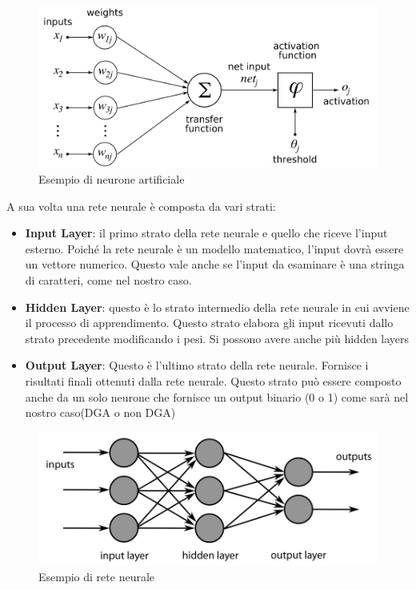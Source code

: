 \documentclass[12pt,a4paper,openright,twoside]{book}
\begin{document}
\begin{figure}
    \centering
    \includegraphics[width=.8\linewidth]{figures/ArtificialNeuronModel.png}
    \caption{Esempio di neurone artificiale \cite{wiki:xxx}}
    \label{fig:AN}
\end{figure}

A sua volta una rete neurale è composta da vari strati:
\begin{itemize}
    \item \textbf{Input Layer}: il primo strato della rete neurale
    e quello che riceve l'input esterno. Poiché la rete neurale
    è un modello matematico, l'input dovrà essere
    un vettore numerico. Questo vale anche se l'input da esaminare
    è una stringa di caratteri, come nel nostro caso.
    \item \textbf{Hidden Layer}: questo è lo strato intermedio della rete neurale in cui avviene
    il processo di apprendimento.
    Questo strato elabora gli input ricevuti dallo strato precedente
    modificando i pesi. Si possono avere anche più hidden layers
    \item \textbf{Output Layer}: Questo è l'ultimo strato della rete neurale.
    Fornisce i risultati finali ottenuti dalla rete neurale. Questo strato
    può essere composto anche da un solo neurone che fornisce
    un output binario (0 o 1) come sarà nel nostro caso(DGA o non DGA)
\end{itemize}

\begin{figure}
    \centering
    \includegraphics[width=.8\linewidth]{figures/MultiLayerNeuralNetwork.png}
    \caption{Esempio di rete neurale \cite{wiki:001}}
    \label{fig:ANN}
\end{figure}
\end{document}
